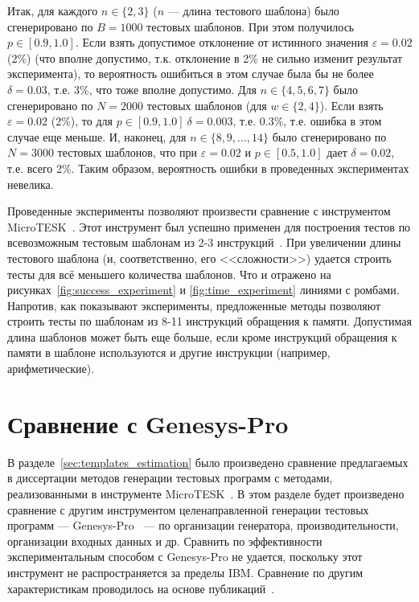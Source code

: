 Итак, для каждого $n \in \{2,3\}$ ($n$ --- длина тестового шаблона) было сгенерировано по $B = 1000$ тестовых шаблонов. При этом получилось $p \in [0.9, 1.0]$. Если взять допустимое отклонение от истинного значения $\varepsilon = 0.02$ (2\%) (что вполне допустимо, т.к. отклонение в 2\% не сильно изменит результат эксперимента), то вероятность ошибиться в этом случае была бы не более $\delta = 0.03$, т.е. 3\%, что тоже вполне допустимо. Для $n \in \{4, 5, 6, 7\}$ было сгенерировано по $N = 2000$ тестовых шаблонов (для $w \in \{2,4\}$). Если взять $\varepsilon = 0.02$ (2\%), то для $p \in [0.9, 1.0] ~ \delta{=}0.003$, т.е. $0.3\%$, т.е. ошибка в этом случае еще меньше. И, наконец, для $n \in \{8, 9, ..., 14\}$ было сгенерировано по $N = 3000$ тестовых шаблонов, что при $\varepsilon = 0.02$ и $p \in [0.5, 1.0]$ дает $\delta = 0.02$, т.е. всего 2\%. Таким образом, вероятность ошибки в проведенных экспериментах невелика.

Проведенные эксперименты позволяют произвести сравнение с инструментом
MicroTESK~\cite{MicroTESK}. Этот инструмент был успешно применен для построения
тестов по всевозможным тестовым шаблонам из 2-3 инструкций~\cite{vorobyev}. При
увеличении длины тестового шаблона (и, соответственно, его <<сложности>>) удается
строить тесты для всё меньшего количества шаблонов. Что и отражено на
рисунках~\ref{fig:success_experiment} и \ref{fig:time_experiment} линиями с
ромбами. Напротив, как показывают эксперименты, предложенные методы позволяют
строить тесты по шаблонам из 8-11 инструкций обращения к памяти. Допустимая
длина шаблонов может быть еще больше, если кроме инструкций обращения к памяти в
шаблоне используются и другие инструкции (например, арифметические).

\section{Сравнение с Genesys-Pro}

В разделе~\ref{sec:templates_estimation} было произведено сравнение предлагаемых в диссертации методов генерации тестовых программ с методами, реализованными в инструменте
MicroTESK~\cite{MicroTESK}. В этом разделе будет произведено сравнение с другим
инструментом целенаправленной генерации тестовых программ --- Genesys-Pro~\cite{GenesysPro} --- по организации генератора, производительности, организации входных данных и др. Сравнить
по эффективности экспериментальным способом с Genesys-Pro не удается, поскольку этот инструмент не распространяется за пределы IBM. Сравнение по другим характеристикам проводилось на основе  публикаций~\cite{GenesysPro2004Innovations, GenesysSolver}.


